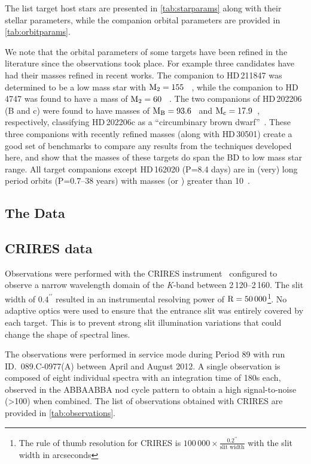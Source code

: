 The list target host stars are presented in \cref{tab:starparams} along with their stellar parameters, while the companion orbital parameters are provided in \cref{tab:orbitparams}.

We note that the orbital parameters of some targets have been refined in the literature since the observations took place.
For example three candidates have had their masses refined in recent works.
The companion to {HD\,211847} was determined to be a low mass star with \(\rm M_2=155~\)\Mjup{}~\citep{moutou_eccentricity_2017}, while the companion to {HD\,4747} was found to have a mass of \(\rm M_2=60~\)\Mjup{}~\citep{crepp_trends_2016}.
The two companions of {HD\,202206} (B and c) were found to have masses of \(\rm M_B =93.6\)~\Mjup{} and \(\rm M_c = 17.9\)~\Mjup{}, respectively, classifying {HD\,202206}c as a ``circumbinary brown dwarf''~\citep{benedict_hd_2017}.
These three companions with recently refined masses (along with {HD\,30501}) create a good set of benchmarks to compare any results from the techniques developed here, and show that the masses of these targets do span the BD to low mass star range.
All target companions except {HD\,162020} (P=8.4 days) are in (very) long period orbits (P=0.7--38 years) with masses (or \mtwosini{}) greater than 10~\Mjup{}.




\subsection{The Data}

\subsection{CRIRES data}
\label{subsec:CRIRES}
Observations were performed with the {CRIRES} instrument~\citep{kaeufl_crires_2004} configured to observe a narrow wavelength domain of the \emph{K}-band between 2\,120--2\,160\nm{}.
The slit width of \(0.4^{\prime\prime}\) resulted in an instrumental resolving power of \(\textrm{R}=50\,000\)\footnote{The rule of thumb resolution for {CRIRES} is \(100\,000\times \frac{0.2^{\prime\prime}}{\textrm{slit width}}\) with the slit width in arcseconds}.
No adaptive optics were used to ensure that the entrance slit was entirely covered by each target.
This is to prevent strong slit illumination variations that could change the shape of spectral lines.

The observations were performed in service mode during Period 89 with run {ID.~089.C-0977(A)} between April and August 2012.
A single observation is composed of eight individual spectra with an integration time of 180\si{\second} each, observed in the {ABBAABBA} nod cycle pattern to obtain a high signal-to-noise (>100) when combined.
The list of observations obtained with {CRIRES} are provided in \cref{tab:observations}.

